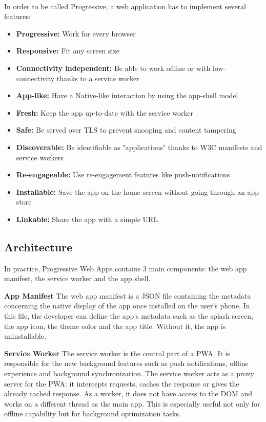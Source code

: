 \documentclass{kththesis}
\begin{document}
\paragraph{}
In order to be called Progressive, a web application has to implement several features\cite{PWA_def}:

\begin{itemize}
    \item \textbf{Progressive:} Work for every browser
    \item \textbf{Responsive:} Fit any screen size
    \item \textbf{Connectivity independent:} Be able to work offline or with low-connectivity thanks to a service worker
    \item \textbf{App-like:} Have a Native-like interaction by using the app-shell model
    \item \textbf{Fresh:} Keep the app up-to-date with the service worker
    \item \textbf{Safe:} Be served over TLS to prevent snooping and content tampering
    \item \textbf{Discoverable:} Be identifiable as "applications" thanks to W3C manifests and service workers
    \item \textbf{Re-engageable:} Use re-engagement features like push-notifications
    \item \textbf{Installable:} Save the app on the home screen without going through an app store
    \item \textbf{Linkable:} Share the app with a simple URL
\end{itemize}

\subsection{Architecture}

In practice, Progressive Web Apps contains 3 main components: the web app manifest, the service worker and the app shell. 

\medskip
\textbf{App Manifest} \newline
The web app manifest is a JSON file containing the metadata concerning the native display of the app once installed on the user's phone. In this file, the developer can define the app's metadata such as the splash screen, the app icon, the theme color and the app title. Without it, the app is uninstallable.

\medskip
\textbf{Service Worker} \newline
The service worker is the central part of a PWA. It is responsible for the new background features such as push notifications, offline experience and background synchronization\cite{SW_def}. The service worker acts as a proxy server for the PWA: it intercepts requests, caches the response or gives the already cached response. As a worker, it does not have access to the DOM and works on a different thread as the main app. This is especially useful not only for offline capability but for background optimization tasks.
\end{document}
